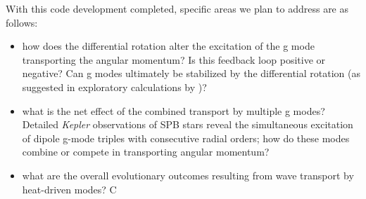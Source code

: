 With this code development completed, specific areas we plan to address are as follows:
\begin{itemize}
\item how does the differential rotation alter the excitation of the g mode transporting the angular momentum? Is this feedback loop positive or negative? Can g modes ultimately be stabilized by the differential rotation (as suggested in exploratory calculations by \cite{Townsend:2008})?
\item what is the net effect of the combined transport by multiple g modes? Detailed \emph{Kepler} observations of SPB stars \citep[e.g., KIC 10526294][]{Papics:2014} reveal the simultaneous excitation of dipole g-mode triples with consecutive radial orders; how do these modes combine or compete in transporting angular momentum?
\item what are the overall evolutionary outcomes resulting from wave transport by heat-driven modes? C
\end{itemize}
